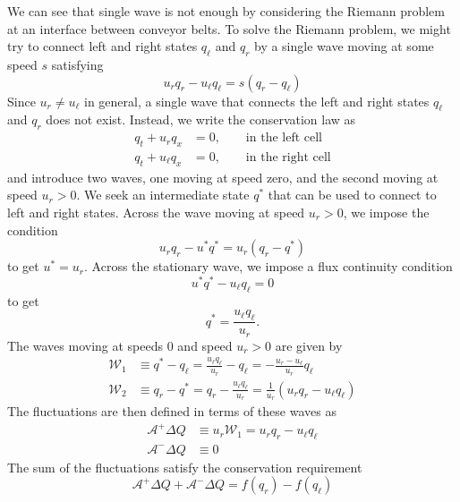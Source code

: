 \documentclass{article}
\begin{document}
We can see that single wave is not enough by considering the Riemann problem at an interface between conveyor belts.   To solve the Riemann problem, we might try to connect left and 
right states $q_\ell$ and $q_r$ by a single wave moving at some speed $s$ satisfying
\begin{equation}
u_r q_r - u_\ell q_\ell = s(q_r - q_\ell)
\end{equation}
Since $u_r \ne u_\ell$ in general, a single wave that connects the left and 
right states $q_\ell$ and $q_r$ does not exist.  Instead, we write the conservation 
law as
\begin{align*}
q_t + u_r q_x & = 0, \qquad \mbox{in the left cell} \\
q_t + u_\ell q_x & = 0, \qquad \mbox{in the right cell}
\end{align*}
and introduce two waves, one moving at speed zero, and the second moving at speed $u_r > 0$.  
We seek an intermediate state $q^*$ that can be used to connect to left and right states.
Across the wave moving at speed $u_r > 0$, we impose the condition
\begin{equation}
u_r q_r - u^* q^* = u_r(q_r - q^*)
\end{equation}
to get $u^* = u_r$.  Across the stationary wave, we impose a flux continuity condition
\begin{equation}
u^* q^* - u_\ell q_\ell = 0
\end{equation}
to get
\begin{equation*}
q^* = \frac{u_\ell q_\ell}{u_r}.
\end{equation*}
The waves moving at speeds 0 and speed $u_r > 0$ are given by
\begin{align*}
\mathcal{W}_1 & \equiv q^* - q_\ell = \frac{u_\ell q_\ell}{u_r} - q_\ell = 
-\frac{u_r - u_\ell}{u_r}q_\ell\\
\mathcal{W}_2 & \equiv q_r - q^* = q_r - \frac{u_\ell q_\ell}{u_r} = 
\frac{1}{u_r}\left(u_r q_r - u_\ell q_\ell\right)
\end{align*}
The fluctuations are then defined in terms of these waves as
\begin{align*}
\mathcal{A}^+ \Delta Q & \equiv u_r \mathcal{W}_1 = u_r q_r - u_\ell q_\ell \\
\mathcal{A}^- \Delta Q & \equiv 0
\end{align*}
The sum of the fluctuations satisfy the conservation requirement
\begin{equation*}
\mathcal{A}^+ \Delta Q + \mathcal{A}^- \Delta Q = f(q_r) - f(q_\ell)
\end{equation*}
\end{document}
